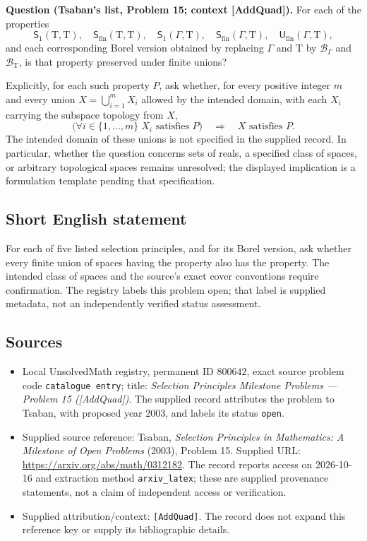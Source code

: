 \documentclass[11pt]{article}
\begin{document}
\textbf{Question (Tsaban's list, Problem 15; context \textnormal{[AddQuad]}).} For each of the properties
\[
\mathsf S_1(\mathrm T,\mathrm T),\quad
\mathsf S_{\mathrm{fin}}(\mathrm T,\mathrm T),\quad
\mathsf S_1(\Gamma,\mathrm T),\quad
\mathsf S_{\mathrm{fin}}(\Gamma,\mathrm T),\quad
\mathsf U_{\mathrm{fin}}(\Gamma,\mathrm T),
\]
and each corresponding Borel version obtained by replacing \(\Gamma\) and \(\mathrm T\) by \(\mathcal B_\Gamma\) and \(\mathcal B_{\mathrm T}\), is that property preserved under finite unions?

Explicitly, for each such property \(P\), ask whether, for every positive integer \(m\) and every union \(X=\bigcup_{i=1}^{m}X_i\) allowed by the intended domain, with each \(X_i\) carrying the subspace topology from \(X\),
\[
\bigl(\forall i\in\{1,\ldots,m\}\;X_i\text{ satisfies }P\bigr)
\quad\Longrightarrow\quad X\text{ satisfies }P.
\]
The intended domain of these unions is not specified in the supplied record. In particular, whether the question concerns sets of reals, a specified class of spaces, or arbitrary topological spaces remains unresolved; the displayed implication is a formulation template pending that specification.
\subsection{Short English statement}
For each of five listed selection principles, and for its Borel version, ask whether every finite union of spaces having the property also has the property. The intended class of spaces and the source's exact cover conventions require confirmation. The registry labels this problem open; that label is supplied metadata, not an independently verified status assessment.
\subsection{Sources}
\begin{itemize}
\item Local UnsolvedMath registry, permanent ID \(800642\), exact source problem code \texttt{catalogue entry}; title: \emph{Selection Principles Milestone Problems --- Problem 15 ([AddQuad])}. The supplied record attributes the problem to Tsaban, with proposed year 2003, and labels its status \texttt{open}.
\item Supplied source reference: Tsaban, \emph{Selection Principles in Mathematics: A Milestone of Open Problems} (2003), Problem 15. Supplied URL: \url{https://arxiv.org/abs/math/0312182}. The record reports access on 2026-10-16 and extraction method \texttt{arxiv\_latex}; these are supplied provenance statements, not a claim of independent access or verification.
\item Supplied attribution/context: \texttt{[AddQuad]}. The record does not expand this reference key or supply its bibliographic details.
\end{itemize}
\end{document}
